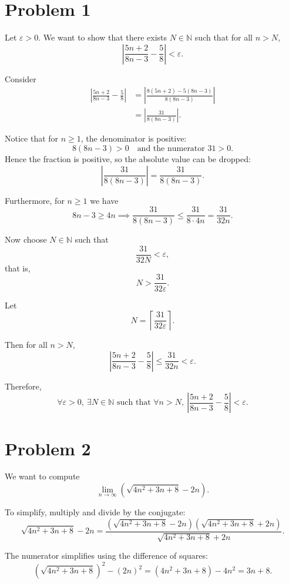 \documentclass[12pt]{article}
\begin{document}
\section*{Problem 1}

Let $\varepsilon > 0$. We want to show that there exists $N \in \mathbb{N}$ such that for all $n > N$,
\[
	\left| \frac{5n+2}{8n-3} - \frac{5}{8} \right| < \varepsilon.
\]

Consider
\begin{align*}
	\left| \frac{5n+2}{8n-3} - \frac{5}{8} \right|
	 & = \left| \frac{8(5n+2) - 5(8n-3)}{8(8n-3)} \right| \\
	 & = \left| \frac{31}{8(8n-3)} \right|.
\end{align*}

Notice that for $n \ge 1$, the denominator is positive:
\[
	8(8n-3) > 0 \quad \text{and the numerator } 31 > 0.
\]
Hence the fraction is positive, so the absolute value can be dropped:
\[
	\left| \frac{31}{8(8n-3)} \right| = \frac{31}{8(8n-3)}.
\]

Furthermore, for $n \ge 1$ we have
\[
	8n - 3 \ge 4n \implies \frac{31}{8(8n-3)} \le \frac{31}{8 \cdot 4n} = \frac{31}{32n}.
\]

Now choose $N \in \mathbb{N}$ such that
\[
	\frac{31}{32N} < \varepsilon,
\]
that is,
\[
	N > \frac{31}{32\varepsilon}.
\]

Let
\[
	N = \left\lceil \frac{31}{32\varepsilon} \right\rceil.
\]

Then for all $n > N$,
\[
	\left| \frac{5n+2}{8n-3} - \frac{5}{8} \right| \le \frac{31}{32n} < \varepsilon.
\]

Therefore,
\[
	\forall \varepsilon > 0, \ \exists N \in \mathbb{N} \text{ such that } \forall n > N, \
	\left| \frac{5n+2}{8n-3} - \frac{5}{8} \right| < \varepsilon.
\]

\section*{Problem 2}
We want to compute
\[
	\lim_{n \to \infty} \left( \sqrt{4n^2 + 3n + 8} - 2n \right).
\]

To simplify, multiply and divide by the conjugate:
\[
	\sqrt{4n^2 + 3n + 8} - 2n
	= \frac{(\sqrt{4n^2 + 3n + 8} - 2n)(\sqrt{4n^2 + 3n + 8} + 2n)}{\sqrt{4n^2 + 3n + 8} + 2n}.
\]

The numerator simplifies using the difference of squares:
\[
	(\sqrt{4n^2 + 3n + 8})^2 - (2n)^2 = (4n^2 + 3n + 8) - 4n^2 = 3n + 8.
\]
\end{document}
